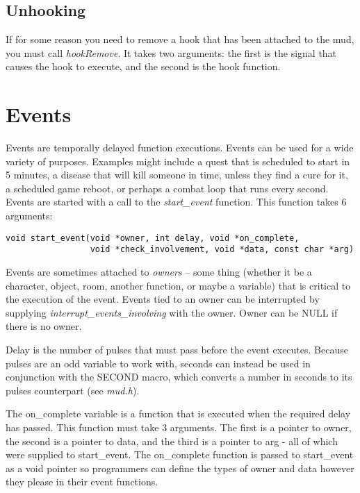 \documentclass[fignum,doc]{article}
\begin{document}
\begin{doublespace}
\subsection{Unhooking}
If for some reason you need to remove a hook that has been attached to the mud, you must call {\it hookRemove}. It takes two arguments: the first is the signal that causes the hook to execute, and the second is the hook function.



\section{Events}
Events are temporally delayed function executions. Events can be used for a wide variety of purposes. Examples might include a quest that is scheduled to start in 5 minutes, a disease that will kill someone in time, unless they find a cure for it, a scheduled game reboot, or perhaps a combat loop that runs every second. Events are started with a call to the {\it start\_event} function. This function takes 6 arguments:
\begin{verbatim}
void start_event(void *owner, int delay, void *on_complete,
                 void *check_involvement, void *data, const char *arg)
\end{verbatim}
Events are sometimes attached to {\it owners} -- some thing (whether it be a character, object, room, another function, or maybe a variable) that is critical to the execution of the event. Events tied to an owner can be interrupted by supplying {\it interrupt\_events\_involving} with the owner. Owner can be NULL if there is no owner. 

Delay is the number of pulses that must pass before the event executes. Because pulses are an odd variable to work with, seconds can instead be used in conjunction with the SECOND macro, which converts a number in seconds to its pulses counterpart (see {\it mud.h}). 

The on\_complete variable is a function that is executed when the required delay has passed. This function must take 3 arguments. The first is a pointer to owner, the second is a pointer to data, and the third is a pointer to arg - all of which were supplied to start\_event. The on\_complete function is passed to start\_event as a void pointer so programmers can define the types of owner and data however they please in their event functions.


\end{doublespace}
\end{document}
